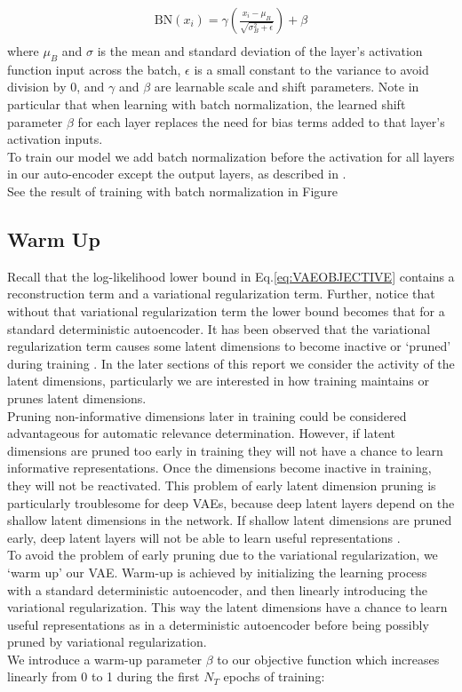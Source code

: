 \documentclass{article} %
\begin{document}
\begin{align*}
    \text{BN}(x_i)=\gamma(\frac{x_i-\mu_B}{\sqrt{\sigma_B^2+\epsilon}})+\beta\\
\end{align*} 
where $\mu_B$ and $\sigma$ is the mean and standard deviation of the layer's activation function input across the batch, $\epsilon$ is a small constant to the variance to avoid division by 0, and $\gamma$ and $\beta$ are learnable scale and shift parameters. Note in particular that when learning with batch normalization, the learned shift parameter $\beta$ for each layer replaces the need for bias terms added to that layer's activation inputs. \\
To train our model we add batch normalization before the activation for all layers in our auto-encoder except the output layers, as described in \cite{Sonderby2016}. \\
See the result of training with batch normalization in Figure %

\subsection{Warm Up}

Recall that the log-likelihood lower bound in Eq.\ref{eq:VAEOBJECTIVE} contains a reconstruction term and a variational regularization term. Further, notice that without that variational regularization term the lower bound becomes that for a standard deterministic autoencoder. It has been observed that the variational regularization term causes some latent dimensions to become inactive or `pruned' during training \cite{MacKay2001, Burda2016}. In the later sections of this report we consider the activity of the latent dimensions, particularly we are interested in how training maintains or prunes latent dimensions. \\
Pruning non-informative dimensions later in training could be considered advantageous for automatic relevance determination. However, if latent dimensions are pruned too early in training they will not have a chance to learn informative representations. Once the dimensions become inactive in training, they will not be reactivated. This problem of early latent dimension pruning is particularly troublesome for deep VAEs, because deep latent layers depend on the shallow latent dimensions in the network. If shallow latent dimensions are pruned early,  deep latent layers will not be able to learn useful representations \cite{Sonderby2016}.\\
To avoid the problem of early pruning due to the variational regularization, we `warm up' our VAE. Warm-up is achieved by initializing the learning process with a standard deterministic autoencoder, and then linearly introducing the variational regularization. This way the latent dimensions have a chance to learn useful representations as in a deterministic autoencoder before being possibly pruned by variational regularization.\\
We introduce a warm-up parameter $\beta$ to our objective function which increases linearly from 0 to 1 during the first $N_T$ epochs of training:
\end{document}
